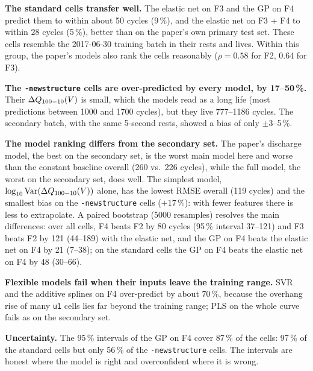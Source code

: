 \textbf{The standard cells transfer well.} The elastic net on F3 and the GP
on F4 predict them to within about 50 cycles (9\,\%), and the elastic net on
F3 + F4 to within 28 cycles (5\,\%), better than on the paper's own primary
test set. These cells resemble the 2017-06-30 training batch in their rests
and lives. Within this group, the paper's models also rank the cells
reasonably ($\rho=0.58$ for F2, $0.64$ for F3).

\textbf{The \texttt{-newstructure} cells are over-predicted by every model,
by 17--50\,\%.} Their $\Delta Q_{100-10}(V)$ is small, which the models read as a long life
(most predictions between 1000 and 1700 cycles), but they live 777--1186 cycles. The
secondary batch, with the same 5-second rests, showed a bias of only
$\pm3$--5\,\%.

\textbf{The model ranking differs from the secondary set.} The paper's
discharge model, the best on the secondary set, is the worst main model here
and worse than the constant baseline overall (260 vs.\ 226 cycles), while the
full model, the worst on the secondary set, does well. The simplest model,
$\log_{10}\mathrm{Var}(\Delta Q_{100-10}(V))$ alone, has the lowest RMSE overall (119 cycles) and the
smallest bias on the \texttt{-newstructure} cells ($+17\,\%$): with fewer
features there is less to extrapolate. A paired bootstrap
(5000 resamples) resolves the main differences: over all cells, F4 beats F2 by
80 cycles (95\,\% interval 37--121) and F3 beats F2 by 121 (44--189) with the
elastic net, and the GP on F4 beats the elastic net on F4 by 21 (7--38); on the
standard cells the GP on F4 beats the elastic net on F4 by 48 (30--66).

\textbf{Flexible models fail when their inputs leave the training range.}
SVR and the additive splines on F4 over-predict by about 70\,\%, because the
overhang rise of many \texttt{u1} cells lies far beyond the training range;
PLS on the whole curve fails as on the secondary set.

\textbf{Uncertainty.} The 95\,\% intervals of the GP on F4 cover 87\,\% of the
cells: 97\,\% of the standard cells but only 56\,\% of the \texttt{-newstructure}
cells. The intervals are honest where the model is right and overconfident
where it is wrong.

